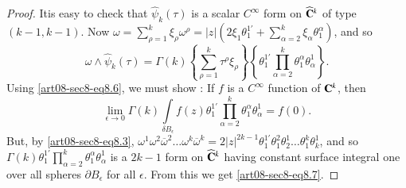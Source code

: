 \begin{proof}
It\pageoriginale is easy to check that $\widehat{\psi}_{k}(\tau)$ is a scalar $C^{\infty}$ form on $\widehat{\mathbf{C}}^{k}$ of type $(k-1,k-1)$. Now $\omega=\sum\limits^{k}_{\rho=1}\xi_{\rho}\omega^{\rho}=|z|(2\xi_{1}\theta^{1'}_{1}+\sum\limits^{k}_{\alpha=2}\xi_{\alpha}\theta^{\alpha}_{1})$, and so
\begin{equation*}
\omega\wedge \widehat{\psi}_{k}(\tau)=\Gamma(k)\left\{\sum\limits^{k}_{\rho=1}\tau^{\rho}\xi_{\rho}\right\}\left\{\theta^{1'}_{1}\prod\limits^{k}_{\alpha=2}\theta^{\alpha}_{1}\theta^{1}_{\alpha}\right\}.\tag{8.6}\label{art08-sec8-eq8.6}
\end{equation*}
Using \eqref{art08-sec8-eq8.6}, we must show : If $f$ is a $C^{\infty}$ function of $\mathbf{C}^{k}$, then
\begin{equation*}
\lim\limits_{\epsilon\to 0}\Gamma(k)\int\limits_{\delta B_{\epsilon}}f(z)\theta^{1'}_{1}\prod\limits^{k}_{\alpha=2}\theta^{\alpha}_{1}\theta^{1}_{\alpha}=f(0).\tag{8.7}\label{art08-sec8-eq8.7}
\end{equation*}
But, by \eqref{art08-sec8-eq8.3}, $\omega^{1}\omega^{2}\overline{\omega}^{2}\ldots\omega^{k}\overline{\omega}^{k}=2|z|^{2k-1}\theta^{1'}_{1}\theta^{2}_{1}\theta^{1}_{2}\ldots\theta^{k}_{1}\theta^{1}_{k}$, and so\break $\Gamma(k)\theta^{1'}_{1}\prod\limits^{k}_{\alpha=2}\theta^{\alpha}_{1}\theta^{1}_{\alpha}$ is a $2k-1$ form on $\widehat{\mathbf{C}}^{k}$ having constant surface integral one over all spheres $\partial B_{\epsilon}$ for all $\epsilon$. From this we get \eqref{art08-sec8-eq8.7}.
\end{proof}

